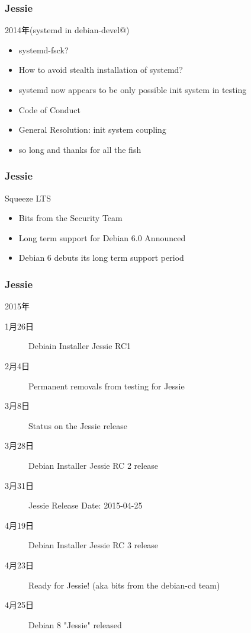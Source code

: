 \documentclass[cjk,dvipdfmx,10pt,compress,%
hyperref={bookmarks=true,bookmarksnumbered=true,bookmarksopen=false,%
colorlinks=false,%
pdftitle={第 97 回 関西 Debian 勉強会},%
pdfauthor={倉敷・のがた・佐々木・かわだ},%
pdfsubject={資料},%
}]{beamer}
\begin{document}
\begin{frame}
  \frametitle{ Jessie }
  \begin{block}{ 2014年(systemd in debian-devel@) }
    \begin{itemize}
    \item systemd-fsck?
    \item How to avoid stealth installation of systemd?
    \item systemd now appears to be only possible init system in testing
    \end{itemize}
  \end{block}

  \begin{block}{ }
    \begin{itemize}
    \item Code of Conduct
    \item General Resolution: init system coupling
    \item so long and thanks for all the fish
    \end{itemize}
  \end{block}
\end{frame}

\begin{frame}
  \frametitle{ Jessie }
  \begin{block}{ Squeeze LTS }
    \begin{itemize}
    \item Bits from the Security Team
    \item Long term support for Debian 6.0 Announced
    \item Debian 6 debuts its long term support period
    \end{itemize}
  \end{block}
\end{frame}

\begin{frame}
  \frametitle{ Jessie }
  \begin{block}{2015年}
    \begin{description}
    \item[1月26日]
      Debiain Installer Jessie RC1
    \item[2月4日]
      Permanent removals from testing for Jessie
    \item[3月8日]
      Status on the Jessie release
    \item[3月28日]
      Debian Installer Jessie RC 2 release
    \item[3月31日]
      Jessie Release Date: 2015-04-25
    \item[4月19日]
      Debian Installer Jessie RC 3 release
    \item[4月23日]
      Ready for Jessie! (aka bits from the debian-cd team)
    \item[4月25日]
      Debian 8 "Jessie" released
    \end{description}
  \end{block}
\end{frame}
\end{document}
